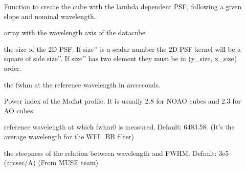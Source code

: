 \documentclass[letterpaper,10pt,english]{sphinxmanual}
\begin{document}

\begin{fulllineitems}
\label{\detokenize{api/pymusepipe:pymusepipe.cube_convolve.psf3d}}
\pysigstartsignatures
{}
\pysigstopsignatures
\sphinxAtStartPar
Function to create the cube with the  lambda dependent PSF, following
a given slope and nominal wavelength.
\begin{description}
\begin{description}
\sphinxAtStartPar
array with the wavelength axis of the datacube

\sphinxAtStartPar
the size of the 2D PSF.  If {\color{red}\bfseries{}\textasciigrave{}\textasciigrave{}}size’’ is a scalar number the 2D PSF
kernel will be a square of side {\color{red}\bfseries{}\textasciigrave{}\textasciigrave{}}size’’. If {\color{red}\bfseries{}\textasciigrave{}\textasciigrave{}}size’’ has two element
they must be in (y\_size, x\_size) order.

\sphinxAtStartPar
the fwhm at the reference wavelength in arcseconds.

\sphinxAtStartPar
Power index of the Moffat profile. It is usually 2.8 for NOAO cubes
and 2.3 for AO cubes.

\sphinxAtStartPar
reference wavelength at which fwhm0 is measured. Default: 6483.58.
(It’s the average wavelength for the WFI\_BB filter)

\sphinxAtStartPar
the steepness of the relation between wavelength and FWHM.
Default: \sphinxhyphen{}3e\sphinxhyphen{}5 (arcsec/A) (From MUSE team)


\end{description}
\end{description}
\end{fulllineitems}
\end{document}
